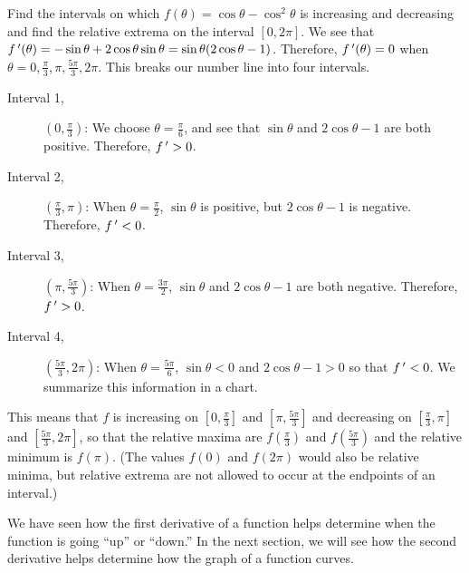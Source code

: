 \begin{example}\label{inc_dec_trig}%
Find the intervals on which $f(\theta)=\cos\theta-\cos^2\theta$ is increasing and decreasing and find the relative extrema on the interval $[0,2\pi]$.
\solution
We see that $f\,'(\theta)=-\sin\theta+2\cos\theta\sin\theta=\sin\theta(2\cos\theta-1)$.  Therefore, $f\,'(\theta)=0$ when $\theta=0,\frac\pi3,\pi,\frac{5\pi}3,2\pi$.  This breaks our number line into four intervals.

\begin{description}%
\item[Interval 1,] $(0,\frac\pi3)$: We choose $\theta=\frac\pi6$, and see that $\sin\theta$ and $2\cos\theta-1$ are both positive.  Therefore, $f\,'>0$.
\item[Interval 2,] $(\frac\pi3,\pi)$: When $\theta=\frac\pi2$, $\sin\theta$ is positive, but $2\cos\theta-1$ is negative.  Therefore, $f\,'<0$.
\item[Interval 3,] $(\pi,\frac{5\pi}3)$: When $\theta=\frac{3\pi}2$, $\sin\theta$ and $2\cos\theta-1$ are both negative.  Therefore, $f\,'>0$.
\item[Interval 4,] $(\frac{5\pi}3,2\pi)$: When $\theta=\frac{5\pi}6$, $\sin\theta<0$ and $2\cos\theta-1>0$ so that $f\,'<0$.  We summarize this information in a chart.
\end{description}

\begin{center}
\end{center}

This means that $f$ is increasing on $[0,\frac\pi3]$ and $[\pi,\frac{5\pi}3]$ and decreasing on $[\frac\pi3,\pi]$ and $[\frac{5\pi}3,2\pi]$, so that the relative maxima are $f(\frac\pi3)$ and $f(\frac{5\pi}3)$ and the relative minimum is $f(\pi)$.  (The values $f(0)$ and $f(2\pi)$ would also be relative minima, but relative extrema are not allowed to occur at the endpoints of an interval.)
\end{example}

We have seen how the first derivative of a function helps determine when the function is going ``up'' or ``down.'' In the next section, we will see how the second derivative helps determine how the graph of a function curves.


